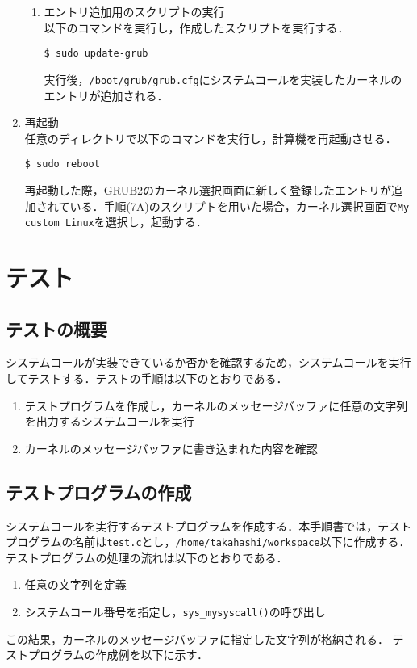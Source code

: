 \documentclass[12pt]{jsarticle}
\begin{document}
\begin{enumerate}
\begin{enumerate}
\item エントリ追加用のスクリプトの実行\\
  以下のコマンドを実行し，作成したスクリプトを実行する．
\begin{verbatim}
$ sudo update-grub
\end{verbatim}
実行後，\verb|/boot/grub/grub.cfg|にシステムコールを実装したカーネルのエントリが追加される．
  \end{enumerate}
  
\item 再起動 \\
  任意のディレクトリで以下のコマンドを実行し，計算機を再起動させる．
\begin{verbatim}
$ sudo reboot
\end{verbatim}
再起動した際，GRUB2のカーネル選択画面に新しく登録したエントリが追加されている．手順(7A)のスクリプトを用いた場合，カーネル選択画面で\verb|My custom Linux|を選択し，起動する．

\end{enumerate}

\newpage
\section{テスト}
\label{sec:test}
\subsection{テストの概要}
システムコールが実装できているか否かを確認するため，システムコールを実行してテストする．テストの手順は以下のとおりである．

\begin{enumerate}
\item テストプログラムを作成し，カーネルのメッセージバッファに任意の文字列を出力するシステムコールを実行
\item カーネルのメッセージバッファに書き込まれた内容を確認
\end{enumerate}

\subsection{テストプログラムの作成}
システムコールを実行するテストプログラムを作成する．本手順書では，テストプログラムの名前は\verb|test.c|とし，\verb|/home/takahashi/workspace|以下に作成する．テストプログラムの処理の流れは以下のとおりである．

\begin{enumerate}
\item 任意の文字列を定義
\item システムコール番号を指定し，\verb|sys_mysyscall()|の呼び出し
\end{enumerate}
この結果，カーネルのメッセージバッファに指定した文字列が格納される．
テストプログラムの作成例を以下に示す．
\end{document}
